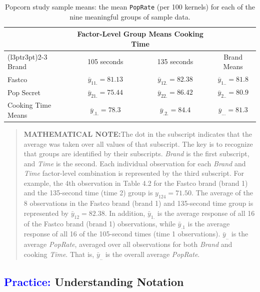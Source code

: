 \documentclass[
]{report}
\begin{document}
\begin{table}[!h]
\centering
\caption{\label{tab:tab43} Popcorn study sample means: the mean \texttt{PopRate} (per 100 kernels) for each of the nine meaningful groups of sample data.}
\centering
\begin{tabular}[t]{lccc}
\toprule
\multicolumn{1}{c}{ } & \multicolumn{2}{c}{Factor-Level Group Means Cooking Time} & \multicolumn{1}{c}{ } \\
\cmidrule(l{3pt}r{3pt}){2-3}
Brand & 105 seconds & 135 seconds & Brand Means\\
\midrule
Fastco & $\overline{y}_{11.} = 81.13$ & $\overline{y}_{12.} = 82.38$ & $\overline{y}_{1..} = 81.8$\\
Pop Secret & $\overline{y}_{21.} = 75.44$ & $\overline{y}_{22.} = 86.42$ & $\overline{y}_{2..} = 80.9$\\
Cooking Time Means & $\overline{y}_{.1.} = 78.3$ & $\overline{y}_{.2.} = 84.4$ & $\overline{y}_{...} = 81.3$\\
\bottomrule
\end{tabular}
\end{table}

\begin{quote}
\textbf{MATHEMATICAL NOTE:}The dot in the subscript indicates that the average was taken over all values of that subscript. The key is to recognize that groups are identified by their subscripts. \emph{Brand} is the first subscript, and \emph{Time} is the second. Each individual observation for each \emph{Brand} and \emph{Time} factor-level combination is represented by the third subscript. For example, the 4th observation in Table 4.2 for the Fastco brand (brand 1) and the 135-second time (time 2) group is \(\scriptstyle y_{124} = 71.50\). The average of the 8 observations in the Fastco brand (brand 1) and 135-second time group is represented by \(\scriptstyle \bar{y}_{12} = 82.38\). In addition, \(\scriptstyle \bar{y}_{1.}\) is the average response of all 16 of the Fastco brand (brand 1) observations, while \(\scriptstyle \bar{y}_{.1}\) is the average response of all 16 of the 105-second times (time 1 observations). \(\scriptstyle \bar{y}_{..}\) is the average \emph{PopRate}, averaged over all observations for both \emph{Brand} and cooking \emph{Time}. That is, \(\scriptstyle \bar{y}_{..}\) is the overall average \emph{PopRate}.
\end{quote}

\hypertarget{understanding-notation}{%
\subsection*{\texorpdfstring{\textcolor{blue}{Practice:} Understanding Notation}{ Understanding Notation}}\label{understanding-notation}}
\end{document}
